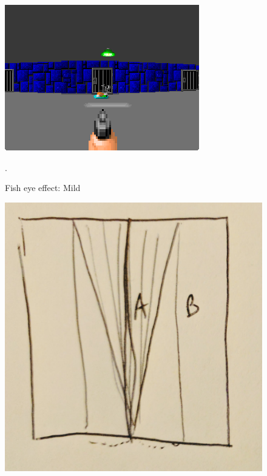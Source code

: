 \begin{figure}[H]
\centering
 \includegraphics[width=\textwidth]{imgs/fish_eye/bad_mild.png}
 \caption{Fish eye effect: Mild}. \label{fig:mips}
 \end{figure}

\begin{figure}[H]
  \centering
 \includegraphics[width=.3\textwidth]{imgs/fish_eye/fish_eye_top_far.png}
\end{figure}
\par


